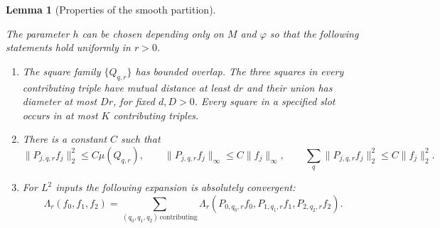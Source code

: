 \documentclass[11pt]{amsart}
\newtheorem{lemma}[theorem]{Lemma}
\theoremstyle{definition}
\theoremstyle{remark}
\numberwithin{equation}{section}
\providecommand{\lean}[1]{}
\providecommand{\leanok}{}
\begin{document}
\begin{lemma}[Properties of the smooth partition]\label{tail:partition}
\lean{Auto.tail_partition}
\leanok
The parameter $h$ can be chosen depending only on $M$ and $\varphi$ so
that the following statements hold uniformly in $r>0$.
\begin{enumerate}
\item The square family $\{Q_{q,r}\}$ has bounded overlap. The three
squares in every contributing triple have mutual distance at least
$d r$ and their union has diameter at most $D r$, for fixed $d,D>0$.
Every square in a specified slot occurs in at most $K$ contributing
triples.
\item There is a constant $C$ such that
\[
 \|P_{j,q,r}f_j\|_2^2\le C\mu(Q_{q,r}),\qquad
 \|P_{j,q,r}f_j\|_\infty\le C\|f_j\|_\infty,
 \qquad
 \sum_q\|P_{j,q,r}f_j\|_2^2\le C\|f_j\|_2^2.
\]
\item For $L^2$ inputs the following expansion is absolutely convergent:
\[
 \Lambda_r(f_0,f_1,f_2)
  =\sum_{(q_0,q_1,q_2)\,\mathrm{contributing}}
     \Lambda_r(P_{0,q_0,r}f_0,P_{1,q_1,r}f_1,P_{2,q_2,r}f_2).
\]
\end{enumerate}
\end{lemma}
\end{document}
